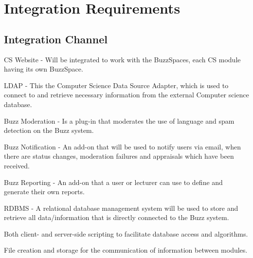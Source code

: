 \documentclass[a4paper,12pt]{report}
\begin{document}
%	
	
	

\section{Integration Requirements}
\subsection{Integration Channel}
\begin{description}
\item CS Website - Will be integrated to work with the BuzzSpaces, each CS module having its own BuzzSpace.
\item LDAP - This the Computer Science Data Source Adapter, which is used to connect to and retrieve necessary information from the external Computer science database. 
\item Buzz Moderation - Is a plug-in that moderates the use of language and spam detection on the Buzz system.
\item Buzz Notification - An add-on that will be used to notify users via email, when there are status changes,
	moderation failures and appraisals which have been received.
\item Buzz Reporting - An add-on that a user or lecturer can use to define and generate their own reports.
\item RDBMS - A relational database management system will be used to store and retrieve all data/information that is directly connected to the Buzz system. 
\item Both client- and server-side scripting to facilitate database access and algorithms.
\item File creation and storage for the communication of information between modules.
\end{description}
\end{document}
